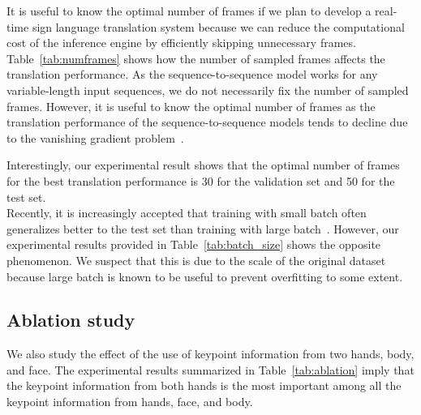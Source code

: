 \documentclass[10pt,twocolumn,letterpaper]{article}
\begin{document}
It is useful to know the optimal number of frames if we plan to develop a real-time sign language translation system because we can reduce the computational cost of the inference engine by efficiently skipping unnecessary frames.
Table~\ref{tab:numframes} shows how the number of sampled frames affects the translation performance. As the sequence-to-sequence model works for any variable-length input sequences, we do not necessarily fix the number of sampled frames. However, it is useful to know the optimal number of frames as the translation performance of the sequence-to-sequence models tends to decline due to the vanishing gradient problem~\cite{PascanuMB13}.

Interestingly, our experimental result shows that the optimal number of frames for the best translation performance is 30 for the validation set and 50 for the test set.
\\

Recently, it is increasingly accepted that training with small batch often generalizes better to the test set than training with large batch~\cite{HofferHS17,SmithKL17}. However, our experimental results provided in
Table~\ref{tab:batch_size} shows the opposite phenomenon. We suspect that this is due to the scale of the original dataset because large batch is known to be useful to prevent
overfitting to some extent.

\subsection{Ablation study}

We also study the effect of the use of keypoint information from two hands, body, and face. The experimental results summarized in Table~\ref{tab:ablation} imply that the keypoint information from both hands is the most important among all the keypoint information from hands, face, and body.

\begin{table}[H]
\caption{Ablation study on the contributions of keypoints from body, face, and hands. The results are obtained on the test set.}
\label{tab:ablation}
\end{table}
\end{document}
